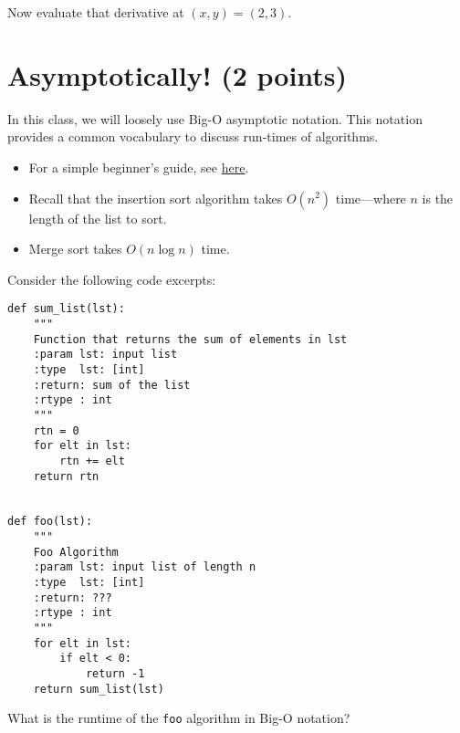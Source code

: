 \documentclass[]{article}
\begin{document}
Now evaluate that derivative at $(x,y) = (2,3)$.
\vspace{1.5cm}

\newpage
\section{Asymptotically! (2 points)}
In this class, we will loosely use Big-O asymptotic notation.  This notation provides a common vocabulary to discuss run-times of algorithms.
\begin{itemize}
\item For a simple beginner's guide, see \href{https://rob-bell.net/2009/06/a-beginners-guide-to-big-o-notation/}{here}.
\item Recall that the insertion sort algorithm takes $O(n^2)$ time---where $n$ is the length of the list to sort.
\item Merge sort takes $O(n\log n)$ time.
\end{itemize}

Consider the following code excerpts:
\begin{tcolorbox}[left=14pt, arc=0pt, outer arc=0pt, colframe=blue!5, colback=blue!5]
\begin{lstlisting}
def sum_list(lst):
    """
    Function that returns the sum of elements in lst
    :param lst: input list
    :type  lst: [int]
    :return: sum of the list
    :rtype : int
    """
    rtn = 0
    for elt in lst:
        rtn += elt
    return rtn


def foo(lst):
    """
    Foo Algorithm
    :param lst: input list of length n
    :type  lst: [int]
    :return: ???
    :rtype : int
    """
    for elt in lst:
        if elt < 0:
            return -1
    return sum_list(lst)
\end{lstlisting}
\end{tcolorbox}

\vspace{0.5cm}

What is the runtime of the \texttt{foo} algorithm in Big-O notation?
\vspace{2cm}
\end{document}
